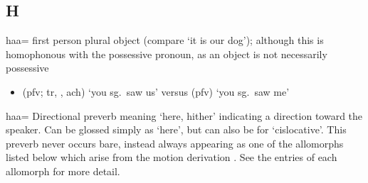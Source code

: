 
\subsection{H}\label{sec:alphalist-h}
\begin{morphdesc}[resume*=alphalist]
\item[haa=]\label{m:haa=1plo}
	first person plural object
	(compare  ‘it is our dog’);
	although this is homophonous with the possessive pronoun,
		 as an object is not necessarily possessive
	\begin{itemize}
	\item	{} (pfv; tr, , ach) ‘you sg.\ saw us’\newline
		versus  (pfv) ‘you sg.\ saw me’
	\end{itemize}

\item[haa=]\label{m:haa=here}
	Directional preverb meaning ‘here, hither’ indicating a direction toward the speaker.
	Can be glossed simply as ‘here’, but can also be  for ‘cislocative’.
	This preverb never occurs bare, instead always appearing as one of the allomorphs listed below
		which arise from the motion derivation
		.
	See the entries of each allomorph for more detail.
	

\end{morphdesc}
